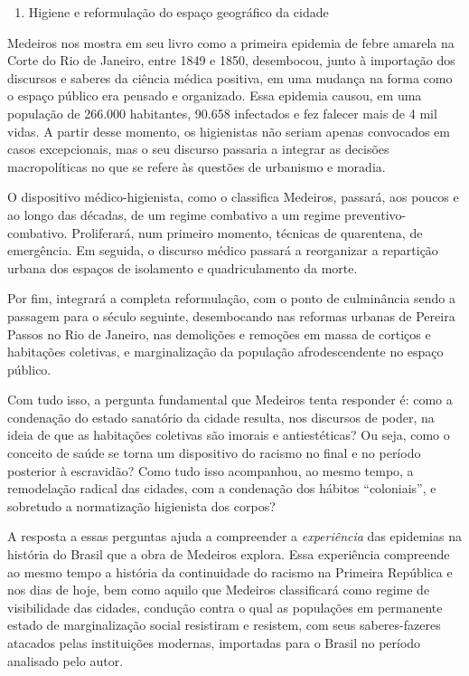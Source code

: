 \begin{enumerate}
\def\labelenumi{\arabic{enumi}.}
\setcounter{enumi}{6}
\tightlist
\item
  Higiene e reformulação do espaço geográfico da cidade
\end{enumerate}

Medeiros nos mostra em seu livro como a primeira epidemia de febre
amarela na Corte do Rio de Janeiro, entre 1849 e 1850, desembocou, junto
à importação dos discursos e saberes da ciência médica positiva, em uma
mudança na forma como o espaço público era pensado e organizado. Essa
epidemia causou, em uma população de 266.000 habitantes, 90.658
infectados e fez falecer mais de 4 mil vidas. A partir desse momento, os
higienistas não seriam apenas convocados em casos excepcionais, mas o
seu discurso passaria a integrar as decisões macropolíticas no que se
refere às questões de urbanismo e moradia.

O dispositivo médico-higienista, como o classifica Medeiros, passará,
aos poucos e ao longo das décadas, de um regime combativo a um regime
preventivo-combativo. Proliferará, num primeiro momento, técnicas de
quarentena, de emergência. Em seguida, o discurso médico passará a
reorganizar a repartição urbana dos espaços de isolamento e
quadriculamento da morte.

Por fim, integrará a completa reformulação, com o ponto de culminância
sendo a passagem para o século seguinte, desembocando nas reformas
urbanas de Pereira Passos no Rio de Janeiro, nas demolições e remoções
em massa de cortiços e habitações coletivas, e marginalização da
população afrodescendente no espaço público.

Com tudo isso, a pergunta fundamental que Medeiros tenta responder é:
como a condenação do estado sanatório da cidade resulta, nos discursos
de poder, na ideia de que as habitações coletivas são imorais e
antiestéticas? Ou seja, como o conceito de saúde se torna um dispositivo
do racismo no final e no período posterior à escravidão? Como tudo isso
acompanhou, ao mesmo tempo, a remodelação radical das cidades, com a
condenação dos hábitos ``coloniais'', e sobretudo a normatização
higienista dos corpos?

A resposta a essas perguntas ajuda a compreender a \emph{experiência}
das epidemias na história do Brasil que a obra de Medeiros explora. Essa
experiência compreende ao mesmo tempo a história da continuidade do
racismo na Primeira República e nos dias de hoje, bem como aquilo que
Medeiros classificará como regime de visibilidade das cidades, condução
contra o qual as populações em permanente estado de marginalização
social resistiram e resistem, com seus saberes-fazeres atacados pelas
instituições modernas, importadas para o Brasil no período analisado
pelo autor.


